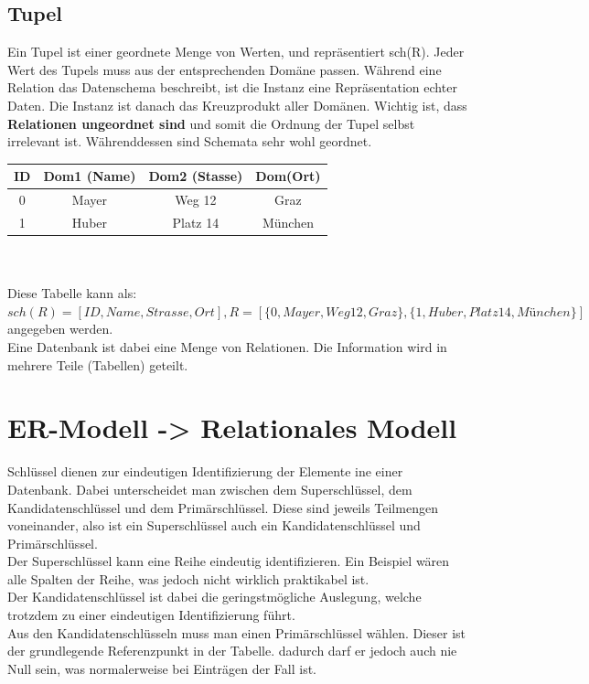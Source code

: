 \documentclass{article}
\begin{document}
	\subsection{Tupel}
	Ein Tupel ist einer geordnete Menge von Werten, und repräsentiert sch(R). Jeder Wert des Tupels muss aus der entsprechenden Domäne passen. Während eine Relation das Datenschema beschreibt, ist die Instanz eine Repräsentation echter Daten. Die Instanz ist danach das Kreuzprodukt aller Domänen. Wichtig ist, dass \textbf{Relationen ungeordnet sind} und somit die Ordnung der Tupel selbst irrelevant ist. Währenddessen sind Schemata sehr wohl geordnet.\\

	\begin{tabular}{| c | c | c | c |}
		\toprule
		ID & Dom1 (Name) & Dom2 (Stasse) & Dom(Ort) \\ \midrule
		0 & Mayer & Weg 12 & Graz \\ \hline
		1 & Huber & Platz 14 & München \\
		\bottomrule
	\end{tabular} \\ \\
	Diese Tabelle kann als: $sch(R)=[ID, Name, Strasse, Ort], R=[\{0, Mayer, Weg 12, Graz\}, \{1, Huber, Platz 14, München\}]$ angegeben werden. \\
	Eine Datenbank ist dabei eine Menge von Relationen. Die Information wird in mehrere Teile (Tabellen) geteilt.
	\section{ER-Modell -> Relationales Modell}
	Schlüssel dienen zur eindeutigen Identifizierung der Elemente ine einer Datenbank. Dabei unterscheidet man zwischen dem Superschlüssel, dem Kandidatenschlüssel und dem Primärschlüssel. Diese sind jeweils Teilmengen voneinander, also ist ein Superschlüssel auch ein Kandidatenschlüssel und Primärschlüssel. \\
	Der Superschlüssel kann eine Reihe eindeutig identifizieren. Ein Beispiel wären alle Spalten der Reihe, was jedoch nicht wirklich praktikabel ist. \\
	Der Kandidatenschlüssel ist dabei die geringstmögliche Auslegung, welche trotzdem zu einer eindeutigen Identifizierung führt. \\
	Aus den Kandidatenschlüsseln muss man einen Primärschlüssel wählen. Dieser ist der grundlegende Referenzpunkt in der Tabelle. dadurch darf er jedoch auch nie Null sein, was normalerweise bei Einträgen der Fall ist.
\end{document}

